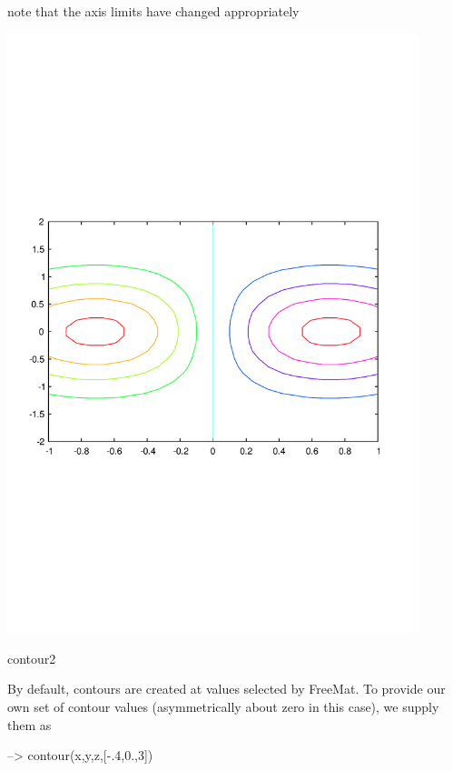 note that the axis limits have changed appropriately  
\begin{DoxyImage}
\includegraphics[width=12cm]{contour2}
\caption{contour2}
\end{DoxyImage}
 By default, contours are created at values selected by Free\-Mat. To provide our own set of contour values (asymmetrically about zero in this case), we supply them as


\begin{DoxyVerbInclude}
--> contour(x,y,z,[-.4,0.,3])
\end{DoxyVerbInclude}



